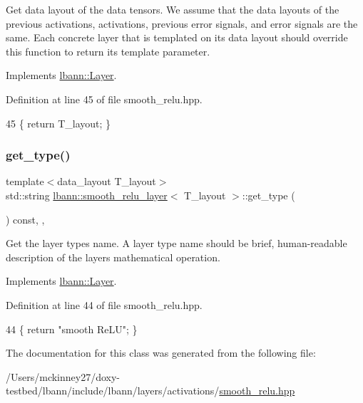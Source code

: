 Get data layout of the data tensors. We assume that the data layouts of the previous activations, activations, previous error signals, and error signals are the same. Each concrete layer that is templated on its data layout should override this function to return its template parameter. 

Implements \hyperlink{classlbann_1_1Layer_a5dfb66e81fc085997402a5e2241316bd}{lbann\+::\+Layer}.



Definition at line 45 of file smooth\+\_\+relu.\+hpp.


\begin{DoxyCode}
45 \{ \textcolor{keywordflow}{return} T\_layout; \}
\end{DoxyCode}
\mbox{\label{classlbann_1_1smooth__relu__layer_a33833fe4b2693b8d25b286d9af7444e5}} 
\subsubsection{\texorpdfstring{get\+\_\+type()}{get\_type()}}
{\footnotesize\ttfamily template$<$data\+\_\+layout T\+\_\+layout$>$ \\
std\+::string \hyperlink{classlbann_1_1smooth__relu__layer}{lbann\+::smooth\+\_\+relu\+\_\+layer}$<$ T\+\_\+layout $>$\+::get\+\_\+type (\begin{DoxyParamCaption}{ }\end{DoxyParamCaption}) const\hspace{0.3cm}{\ttfamily [inline]}, {\ttfamily [override]}, {\ttfamily [virtual]}}

Get the layer type\textquotesingle{}s name. A layer type name should be brief, human-\/readable description of the layer\textquotesingle{}s mathematical operation. 

Implements \hyperlink{classlbann_1_1Layer_a0fa0ea9160b490c151c0a17fde4f7239}{lbann\+::\+Layer}.



Definition at line 44 of file smooth\+\_\+relu.\+hpp.


\begin{DoxyCode}
44 \{ \textcolor{keywordflow}{return} \textcolor{stringliteral}{"smooth ReLU"}; \}
\end{DoxyCode}


The documentation for this class was generated from the following file\+:\begin{DoxyCompactItemize}
\item 
/\+Users/mckinney27/doxy-\/testbed/lbann/include/lbann/layers/activations/\hyperlink{smooth__relu_8hpp}{smooth\+\_\+relu.\+hpp}\end{DoxyCompactItemize}
